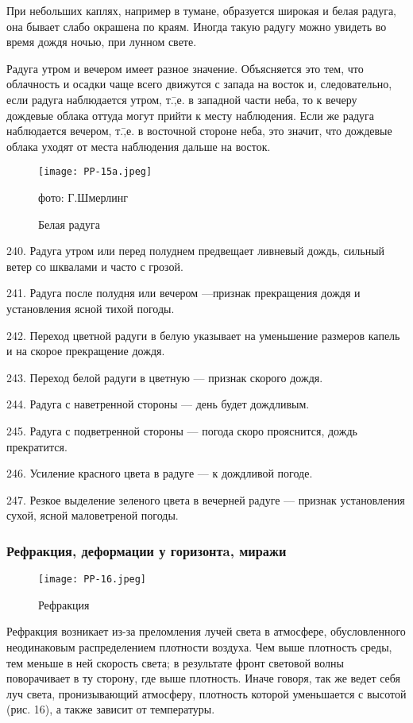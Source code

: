 При небольших каплях, например в тумане, образуется широкая и белая радуга, она бывает слабо окрашена по краям. Иногда такую радугу можно увидеть во время дождя ночью, при лунном свете.

Радуга утром и вечером имеет разное значение. Объясняется это тем, что облачность и осадки чаще всего движутся с запада на восток и, следовательно, если радуга наблюдается утром, т.\=,е. в западной части неба, то к вечеру дождевые облака оттуда могут прийти к месту наблюдения. Если же радуга наблюдается вечером, т.\=,е. в восточной стороне неба, это значит, что дождевые облака уходят от места наблюдения дальше на восток.

\begin{figure}[htb]
  \centering{}
  \texttt{[image: PP-15a.jpeg]}
  \caption{Белая радуга}
  \label{fig:pp15a}
  \small
  \centering{}фото: Г.Шмерлинг
\end{figure}

240. Радуга утром или перед полуднем предвещает ливневый дождь, сильный ветер со шквалами и часто с грозой.

241. Радуга после полудня или вечером —признак прекращения дождя и установления ясной тихой погоды.

242. Переход цветной радуги в белую указывает на уменьшение размеров капель и на скорое прекращение дождя.

243. Переход белой радуги в цветную — признак скорого дождя.

244. Радуга с наветренной стороны — день будет дождливым.

245. Радуга с подветренной стороны — погода скоро прояснится, дождь прекратится.

246. Усиление красного цвета в радуге — к дождливой погоде.

247. Резкое выделение зеленого цвета в вечерней радуге — признак установления сухой, ясной маловетреной погоды.

\subsubsection{Рефракция, деформации у горизонтa, миражи}

\begin{figure}[htb]
  \centering{}
  \texttt{[image: PP-16.jpeg]}
  \caption{Рефракция}
  \label{fig:pp16}
  \small
  \centering{}
\end{figure}

Рефракция возникает из-за преломления лучей света в атмосфере, обусловленного неодинаковым распределением плотности воздуха. Чем выше плотность среды, тем меньше в ней скорость света; в результате фронт световой волны поворачивает в ту сторону, где выше плотность. Иначе говоря, так же ведет себя луч света, пронизывающий атмосферу, плотность которой уменьшается с высотой (рис. 16), а также зависит от температуры.

